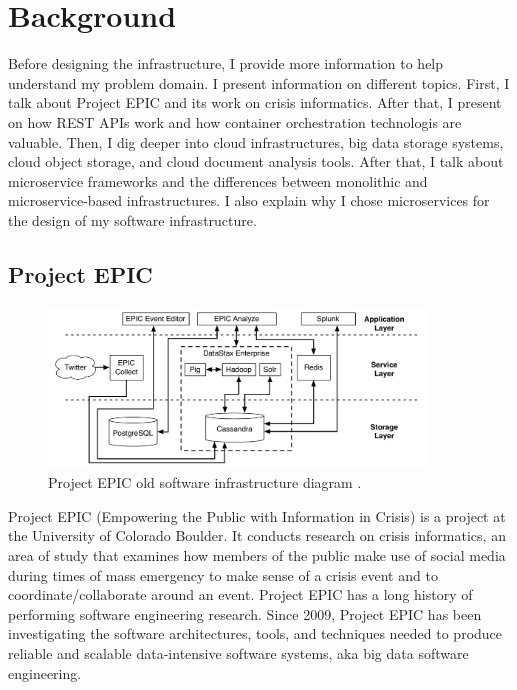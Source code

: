 \chapter{Background}

Before designing the infrastructure, I provide more information to help understand my problem domain. I present information on different topics. First, I talk about Project EPIC and its work on crisis informatics. After that, I present on how REST APIs work and how container orchestration technologis are valuable. Then, I dig deeper into cloud infrastructures, big data storage systems, cloud object storage, and cloud document analysis tools. After that, I talk about microservice frameworks and the differences between monolithic and microservice-based infrastructures. I also explain why I chose microservices for the design of my software infrastructure. 

\section{Project EPIC}

\begin{figure}[htbp]
	\caption{\label{fig:oldepicinfra}
	Project EPIC old software infrastructure diagram .
	}
    \begin{center}
	\includegraphics[width=100mm]{figs/old-arch.pdf}
    \end{center}
\label{xfigDiagram}
\end{figure}

Project EPIC (Empowering the Public with Information in Crisis) is a project at the University of Colorado Boulder. It conducts research on crisis informatics, an area of study that examines how members of the public make use of social media during times of mass emergency to make sense of a crisis event and to coordinate/collaborate around an event. Project EPIC has a long history of performing software engineering research. Since 2009, Project EPIC has been investigating the software architectures, tools, and techniques needed to produce reliable and scalable data-intensive software systems, aka big data software engineering\cite{Anderson:2015b}.

